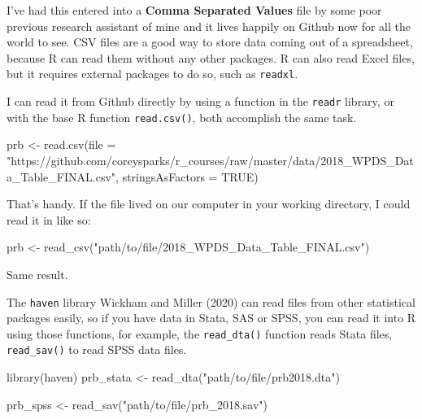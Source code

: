 \documentclass[
  letterpaper,
  DIV=11,
  numbers=noendperiod]{scrreprt}
\newenvironment{Shaded}{\begin{snugshade}}{\end{snugshade}}
\newcommand{\AttributeTok}[1]{\textcolor[rgb]{0.40,0.45,0.13}{#1}}
\newcommand{\ConstantTok}[1]{\textcolor[rgb]{0.56,0.35,0.01}{#1}}
\newcommand{\FunctionTok}[1]{\textcolor[rgb]{0.28,0.35,0.67}{#1}}
\newcommand{\NormalTok}[1]{\textcolor[rgb]{0.00,0.23,0.31}{#1}}
\newcommand{\OtherTok}[1]{\textcolor[rgb]{0.00,0.23,0.31}{#1}}
\newcommand{\StringTok}[1]{\textcolor[rgb]{0.13,0.47,0.30}{#1}}
\begin{document}
I've had this entered into a \textbf{Comma Separated Values} file by
some poor previous research assistant of mine and it lives happily on
Github now for all the world to see. CSV files are a good way to store
data coming out of a spreadsheet, because R can read them without any
other packages. R can also read Excel files, but it requires external
packages to do so, such as \texttt{readxl}.

I can read it from Github directly by using a function in the
\texttt{readr} library, or with the base R function \texttt{read.csv()},
both accomplish the same task.

\begin{Shaded}
\begin{Highlighting}[]
\NormalTok{prb }\OtherTok{\textless{}{-}} \FunctionTok{read.csv}\NormalTok{(}\AttributeTok{file =} \StringTok{"https://github.com/coreysparks/r\_courses/raw/master/data/2018\_WPDS\_Data\_Table\_FINAL.csv"}\NormalTok{,}
    \AttributeTok{stringsAsFactors =} \ConstantTok{TRUE}\NormalTok{)}
\end{Highlighting}
\end{Shaded}

That's handy. If the file lived on our computer in your working
directory, I could read it in like so:

\begin{Shaded}
\begin{Highlighting}[]
\NormalTok{prb }\OtherTok{\textless{}{-}} \FunctionTok{read\_csv}\NormalTok{(}\StringTok{"path/to/file/2018\_WPDS\_Data\_Table\_FINAL.csv"}\NormalTok{)}
\end{Highlighting}
\end{Shaded}

Same result.

The \texttt{haven} library Wickham and Miller (2020) can read files from
other statistical packages easily, so if you have data in Stata, SAS or
SPSS, you can read it into R using those functions, for example, the
\texttt{read\_dta()} function reads Stata files, \texttt{read\_sav()} to
read SPSS data files.

\begin{Shaded}
\begin{Highlighting}[]
\FunctionTok{library}\NormalTok{(haven)}
\NormalTok{prb\_stata }\OtherTok{\textless{}{-}} \FunctionTok{read\_dta}\NormalTok{(}\StringTok{"path/to/file/prb2018.dta"}\NormalTok{)}

\NormalTok{prb\_spss }\OtherTok{\textless{}{-}} \FunctionTok{read\_sav}\NormalTok{(}\StringTok{"path/to/file/prb\_2018.sav"}\NormalTok{)}
\end{Highlighting}
\end{Shaded}
\end{document}
